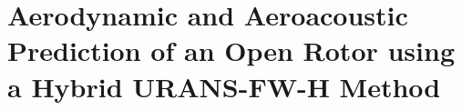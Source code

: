 
\chapter{Aerodynamic and Aeroacoustic Prediction of an Open Rotor using a Hybrid URANS-FW-H Method} \label{ch:open_rotor}